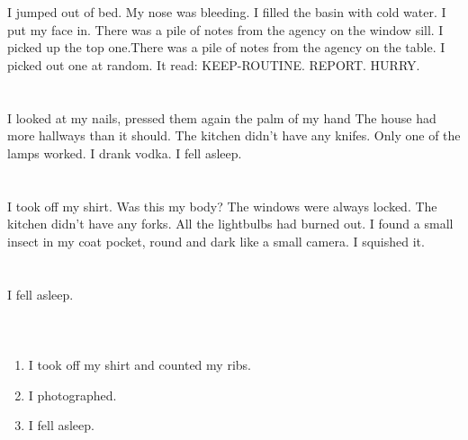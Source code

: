 \documentclass{article}
\begin{document}
    \section{}
    I jumped out of bed. My nose was bleeding. I filled the basin with cold water. I put my face in. There was a pile of notes from the agency on the window sill. I picked up the top one.There was a pile of notes from the agency on the table. I picked out one at random. It read: KEEP-ROUTINE. REPORT. HURRY.  
    \newpage
    
    \section{}
    I looked at my nails, pressed them again the palm of my hand The house had more hallways than it should. The kitchen didn't have any knifes. Only one of the lamps worked. I drank vodka. I fell asleep.  
    \newpage
    
    \section{}
    I took off my shirt. Was this my body? The windows were always locked. The kitchen didn't have any forks. All the lightbulbs had burned out. I found a small insect in my coat pocket, round and dark like a small camera. I squished it.  
    \newpage
    
    \section{}
    I fell asleep.\\\\ 
    \newpage
    
    \section{}
    
    \begin{enumerate}
    
    \item I took off my shirt and counted my ribs.\\
    
    \item I photographed.\\
    
    \item I fell asleep.\\
    
    \end{enumerate}
     
\end{document}
